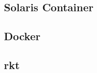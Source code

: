 \subsection{Solaris Container}
\label{sec:solariscontainer}







\subsection{Docker}
\label{sec:Docker}




\subsection{rkt}
\label{sec:rkt}

